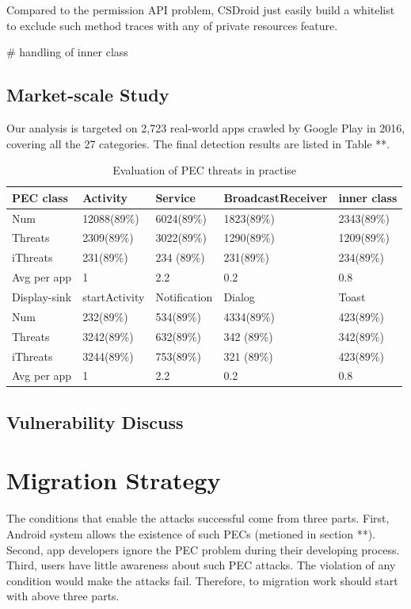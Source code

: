 \documentclass{sig-alternate-05-2015}
\begin{document}
Compared to the permission API problem, CSDroid just easily build a whitelist to exclude such method traces with any of private resources feature.



\# handling of inner class  

\subsection{Market-scale Study}

Our analysis is targeted on 2,723 real-world apps crawled by Google Play in 2016, covering all the 27 categories. The final detection results are listed in Table **. 

\begin{table}[htbp]
\centering
 \caption{\label{tab:test} Evaluation of PEC threats in practise}
 \begin{tabularx}{\linewidth}{XXXXX}

  \toprule
  PEC class  & Activity & Service & BroadcastReceiver & inner class \\
  \midrule
 Num & 12088(89\%) & 6024(89\%) & 1823(89\%) & 2343(89\%) \\
 Threats  & 2309(89\%) & 3022(89\%) & 1290(89\%) & 1209(89\%)\\ 
 iThreats  & 231(89\%) & 234 (89\%)& 231(89\%) & 234(89\%)\\
 Avg per app & 1 & 2.2 & 0.2 & 0.8\\
 \bottomrule
 
 \toprule
 Display-sink & startActivity & Notification & Dialog & Toast \\ 
 \midrule   
 Num & 232(89\%) & 534(89\%) & 4334(89\%) & 423(89\%)\\
 Threats & 3242(89\%) & 632(89\%) & 342 (89\%)& 342(89\%)\\
 iThreats & 3244(89\%) & 753(89\%) & 321 (89\%)& 423(89\%)\\
 Avg per app & 1 & 2.2 & 0.2 & 0.8\\
     
  \bottomrule
 \end{tabularx}
\end{table}


\subsection{Vulnerability Discuss}

\section{Migration Strategy}
The conditions that enable the attacks successful come from three parts. First, Android system allows the existence of such PECs (metioned in section **). Second, app developers ignore the PEC problem during their developing process. Third, users have little awareness about such PEC attacks. The violation of any condition would make the attacks fail. Therefore, to migration work should start with above three parts.
 
\end{document}
